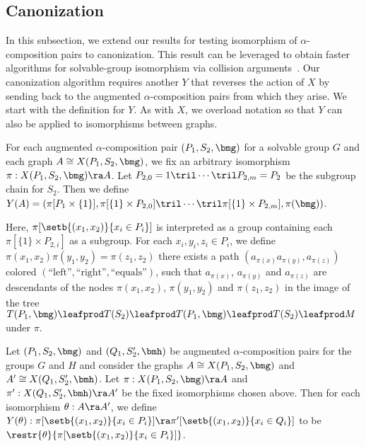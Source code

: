 \subsection{Canonization}
In this subsection, we extend our results for testing isomorphism of $\alpha$-composition pairs to canonization.  This result can be leveraged to obtain faster algorithms for solvable-group isomorphism via collision arguments~\cite{rosenbaum2013b}.  Our canonization algorithm requires another  $Y$ that reverses the action of $X$ by sending back to the augmented $\alpha$-composition pairs from which they arise.  We start with the definition for $Y$.  As with $X$, we overload notation so that $Y$ can also be applied to isomorphisms between graphs.

\begin{definition}
  \label{defn:Y-A}
  For each augmented $\alpha$-composition pair $(P_1, S_2, \bmg)$ for a solvable group $G$ and each graph $A \cong X(P_1, S_2, \bmg)$, we fix an arbitrary isomorphism $\pi : X(P_1, S_2, \bmg) \ra A$.  Let $P_{2, 0} = 1 \tril \cdots \tril P_{2, m} = P_2$ be the subgroup chain for $S_2$.  Then we define $Y(A) = (\pi[P_1 \times \{1\}], \pi[\{1\} \times P_{2, 0}] \tril \cdots \tril \pi[\{1\} \times P_{2, m}], \pi(\bmg))$.

  Here, $\pi[\setb{(x_1, x_2)}{x_i \in P_i}]$ is interpreted as a group containing each $\pi[\{1\} \times P_{2, i}]$ as a subgroup.  For each $x_i, y_i, z_i \in P_i$, we define $\pi(x_1, x_2) \pi(y_1, y_2) = \pi(z_1, z_2)$ \ifft there exists a path $(a_{\pi(x)} a_{\pi(y)}, a_{\pi(z)})$ colored $(\text{``left''}, \text{``right''}, \text{``equals''})$, such that $a_{\pi(x)}$, $a_{\pi(y)}$ and $a_{\pi(z)}$ are descendants of the nodes $\pi(x_1, x_2)$, $\pi(y_1, y_2)$ and $\pi(z_1, z_2)$ in the image of the tree $T(P_1, \bmg) \leafprod T(S_2) \leafprod T(P_1, \bmg) \leafprod T(S_2) \leafprod M$ under $\pi$.

  Let $(P_1, S_2, \bmg)$ and $(Q_1, S_2', \bmh)$ be augmented $\alpha$-composition pairs for the groups $G$ and $H$ and consider the graphs $A \cong X(P_1, S_2, \bmg)$ and  $A' \cong X(Q_1, S_2', \bmh)$.  Let
  $\pi : X(P_1, S_2, \bmg) \ra A$ and $\pi' : X(Q_1, S_2', \bmh) \ra A'$ be the fixed isomorphisms chosen above.  Then for each isomorphism $\theta : A \ra A'$, we define $Y(\theta) : \pi[\setb{(x_1, x_2)}{x_i \in P_i}] \ra \pi'[\setb{(x_1, x_2)}{x_i \in Q_i}]$ to be $\restr{\theta}{\pi[\setb{(x_1, x_2)}{x_i \in P_i}]}$.
\end{definition}

